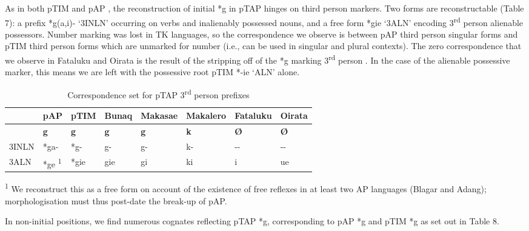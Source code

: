 As in both pTIM \citep[213-214]{SchapperEtAl2012} and pAP \citep[98]{HoltonEtAl}, the reconstruction of initial *g in pTAP hinges on third person markers. Two forms are reconstructable (Table 7): a prefix *g(a,i)- `3INLN' occurring on verbs and inalienably possessed nouns, and a free form *gie `3ALN' encoding 3\textsuperscript{rd} person alienable possessors. Number marking was lost in TK languages, so the correspondence we observe is between pAP third person singular forms and pTIM third person forms which are unmarked for number (i.e., can be used in singular and plural contexts). The zero correspondence that we observe in Fataluku and Oirata is the result of the stripping off of the *g marking 3\textsuperscript{rd} person \citep[as set out in][214]{SchapperEtAl}. In the case of the alienable possessive marker, this means we are left with the possessive root pTIM *-ie `ALN' alone.


\begin{sidewaystable}\centering


\begin{tabular}{llllllll}
\hline&pAP&pTIM&Bunaq&Makasae&Makalero&Fataluku&Oirata\\\hline&{\bfseries *g}&{\bfseries *g}&{\bfseries g}&{\bfseries g}&{\bfseries k}&{\bfseries {\O}}&{\bfseries {\O}}\\\hline
3INLN&*ga-&*g-&g-&g-&k-&{}-{}-&{}-{}-\\
3ALN&*ge \textsuperscript{1}&*gie&gie&gi&ki&i&ue\\\hline

\end{tabular}

\begin{flushleft}
\textsuperscript{1} We reconstruct this as a free form on account of the existence of free reflexes in at least two AP languages (Blagar and Adang); morphologisation must thus post-date the break-up of pAP.
\end{flushleft}\caption{Correspondence set for pTAP 3\textsuperscript{rd} person prefixes}
\end{sidewaystable}
In non-initial positions, we find numerous cognates reflecting pTAP *g, corresponding to pAP *g and pTIM *g as set out in Table 8.




